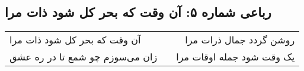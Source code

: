 \begin{center}
\section*{رباعی شماره ۵: آن وقت که بحر کل شود ذات مرا}
\label{sec:0005}
\begin{longtable}{l p{0.5cm} r}
آن وقت که بحر کل شود ذات مرا
&&
روشن گردد جمال ذرات مرا
\\
زان می‌سوزم چو شمع تا در ره عشق
&&
یک وقت شود جمله اوقات مرا
\\
\end{longtable}
\end{center}

